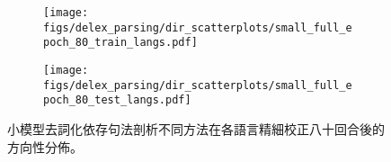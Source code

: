 \begin{figure}[htbp]
    \centering
    \begin{subfigure}[t]{0.7\textwidth}
        \centering
        \texttt{[image: figs/delex\_parsing/dir\_scatterplots/small\_full\_epoch\_80\_train\_langs.pdf]}
    \end{subfigure}
    \vspace{-12pt}
    \begin{subfigure}[t]{0.7\textwidth}
        \centering
        \texttt{[image: figs/delex\_parsing/dir\_scatterplots/small\_full\_epoch\_80\_test\_langs.pdf]}
    \end{subfigure}
    \caption{小模型去詞化依存句法剖析不同方法在各語言精細校正八十回合後的方向性分佈。}
    \label{fig:small_dir_scatter_full_epoch_80}
\end{figure}
